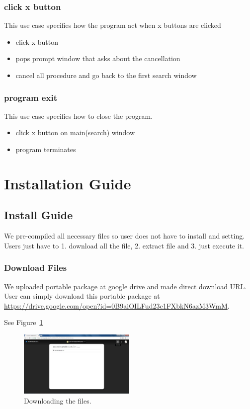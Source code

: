 \documentclass[conference]{IEEEtran}
\begin{document}
\subsubsection{click x button}
This use case specifies how the program act when x buttons are clicked
\begin{itemize}
  \item click x button
  \item pops prompt window that asks about the cancellation
  \item cancel all procedure and go back to the first search window
\end{itemize}
\textit{}

\subsubsection{program exit}
This use case specifies how to close the program.
\begin{itemize}
  \item click x button on main(search) window
  \item program terminates
\end{itemize}
\textit{}



\section{Installation Guide}%
\label{sec:installation guide}
\textit{}

\subsection{Install Guide}
  We pre-compiled all necessary files so user does not have to install and setting.
  Users just have to 1. download all the file, 2. extract file and 3. just execute it.

  \subsubsection{Download Files}
    We uploaded portable package at google drive and made direct download URL. User can simply download this portable package at 
    \url{https://drive.google.com/open?id=0B9aiOILFud23c1FXbkN6azM3WmM}.

    See Figure~\ref{fig_download}
      \begin{figure}[ht]
      \centering
      \includegraphics[width=0.5\textwidth]{./figures/downloadURL.jpg}
      \caption{Downloading the files.}
      \label{fig_download}
      \end{figure}
\end{document}
